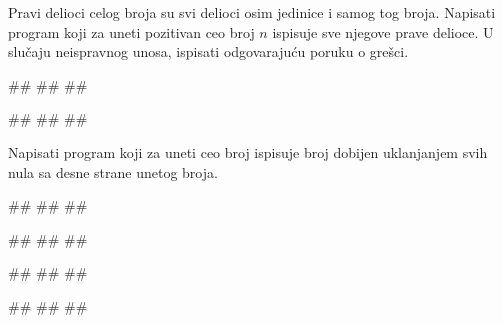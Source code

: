 \begin{Exercise}[label=PET_08] 
Pravi delioci celog broja su svi delioci osim jedinice i samog tog
broja. Napisati program koji za uneti pozitivan ceo broj $n$
ispisuje sve njegove prave delioce.
U slučaju neispravnog unosa, ispisati odgovarajuću poruku o grešci.

\begin{miditest}
\begin{upotreba}{1}
#\naslovInt#
##
##
\end{upotreba}
\end{miditest}
\begin{miditest}
\begin{upotreba}{2}
#\naslovInt#
##
##
\end{upotreba}
\end{miditest}
\end{Exercise}
\ifresenja
\begin{Answer}[ref=PET_08]
\end{Answer}
\fi


\begin{Exercise}[label=PET_09] 
Napisati program koji za uneti ceo broj ispisuje broj dobijen
uklanjanjem svih nula sa desne strane unetog broja.
 
\begin{miditest}
\begin{upotreba}{1}
#\naslovInt#
##
##
\end{upotreba}
\end{miditest}
\begin{miditest}
\begin{upotreba}{2}
#\naslovInt#
##
##
\end{upotreba}
\end{miditest}

\begin{miditest}
\begin{upotreba}{3}
#\naslovInt#
##
##
\end{upotreba}
\end{miditest}
\begin{miditest}
\begin{upotreba}{4}
#\naslovInt#
##
##
\end{upotreba}
\end{miditest}

\end{Exercise}
\ifresenja
\begin{Answer}[ref=PET_09]
\end{Answer}
\fi


